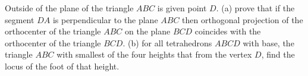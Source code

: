 Outside of the plane of the triangle $ABC$ is given point $D$.
(a) prove that if the segment $DA$ is perpendicular to the plane $ABC$ then orthogonal projection of the orthocenter of the triangle $ABC$ on the plane $BCD$ coincides with the orthocenter of the triangle $BCD$.
(b) for all tetrahedrons $ABCD$ with base, the triangle $ABC$ with smallest of the four heights that from the vertex $D$, find the locus of the foot of that height.